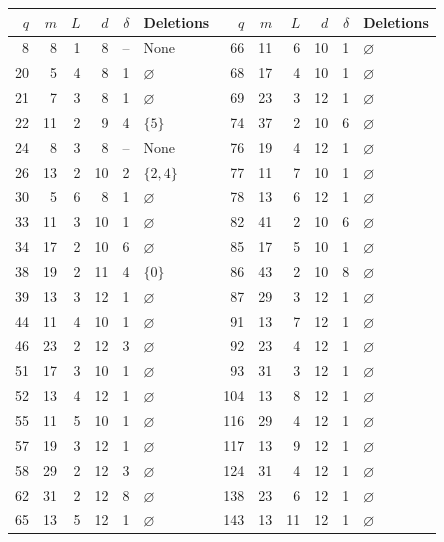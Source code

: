 \documentclass[10pt]{article}
\numberwithin{equation}{section}
\begin{document}
\begin{center}
\begin{minipage}{\linewidth}
\centering
{}
\label{finite:tab:linear-seed-bank}
\begin{tabular}{@{}rrrrrl@{\qquad\qquad}rrrrrl@{}}
\toprule
$q$&$m$&$L$&$d$&$\delta$&Deletions&$q$&$m$&$L$&$d$&$\delta$&Deletions\\\midrule
8 & 8 & 1 & 8 & -- & None & 66 & 11 & 6 & 10 & 1 & $\varnothing$\\
20 & 5 & 4 & 8 & 1 & $\varnothing$ & 68 & 17 & 4 & 10 & 1 & $\varnothing$\\
21 & 7 & 3 & 8 & 1 & $\varnothing$ & 69 & 23 & 3 & 12 & 1 & $\varnothing$\\
22 & 11 & 2 & 9 & 4 & $\{5\}$ & 74 & 37 & 2 & 10 & 6 & $\varnothing$\\
24 & 8 & 3 & 8 & -- & None & 76 & 19 & 4 & 12 & 1 & $\varnothing$\\
26 & 13 & 2 & 10 & 2 & $\{2,4\}$ & 77 & 11 & 7 & 10 & 1 & $\varnothing$\\
30 & 5 & 6 & 8 & 1 & $\varnothing$ & 78 & 13 & 6 & 12 & 1 & $\varnothing$\\
33 & 11 & 3 & 10 & 1 & $\varnothing$ & 82 & 41 & 2 & 10 & 6 & $\varnothing$\\
34 & 17 & 2 & 10 & 6 & $\varnothing$ & 85 & 17 & 5 & 10 & 1 & $\varnothing$\\
38 & 19 & 2 & 11 & 4 & $\{0\}$ & 86 & 43 & 2 & 10 & 8 & $\varnothing$\\
39 & 13 & 3 & 12 & 1 & $\varnothing$ & 87 & 29 & 3 & 12 & 1 & $\varnothing$\\
44 & 11 & 4 & 10 & 1 & $\varnothing$ & 91 & 13 & 7 & 12 & 1 & $\varnothing$\\
46 & 23 & 2 & 12 & 3 & $\varnothing$ & 92 & 23 & 4 & 12 & 1 & $\varnothing$\\
51 & 17 & 3 & 10 & 1 & $\varnothing$ & 93 & 31 & 3 & 12 & 1 & $\varnothing$\\
52 & 13 & 4 & 12 & 1 & $\varnothing$ & 104 & 13 & 8 & 12 & 1 & $\varnothing$\\
55 & 11 & 5 & 10 & 1 & $\varnothing$ & 116 & 29 & 4 & 12 & 1 & $\varnothing$\\
57 & 19 & 3 & 12 & 1 & $\varnothing$ & 117 & 13 & 9 & 12 & 1 & $\varnothing$\\
58 & 29 & 2 & 12 & 3 & $\varnothing$ & 124 & 31 & 4 & 12 & 1 & $\varnothing$\\
62 & 31 & 2 & 12 & 8 & $\varnothing$ & 138 & 23 & 6 & 12 & 1 & $\varnothing$\\
65 & 13 & 5 & 12 & 1 & $\varnothing$ & 143 & 13 & 11 & 12 & 1 & $\varnothing$\\
\bottomrule
\end{tabular}
\end{minipage}
\end{center}
\end{document}
